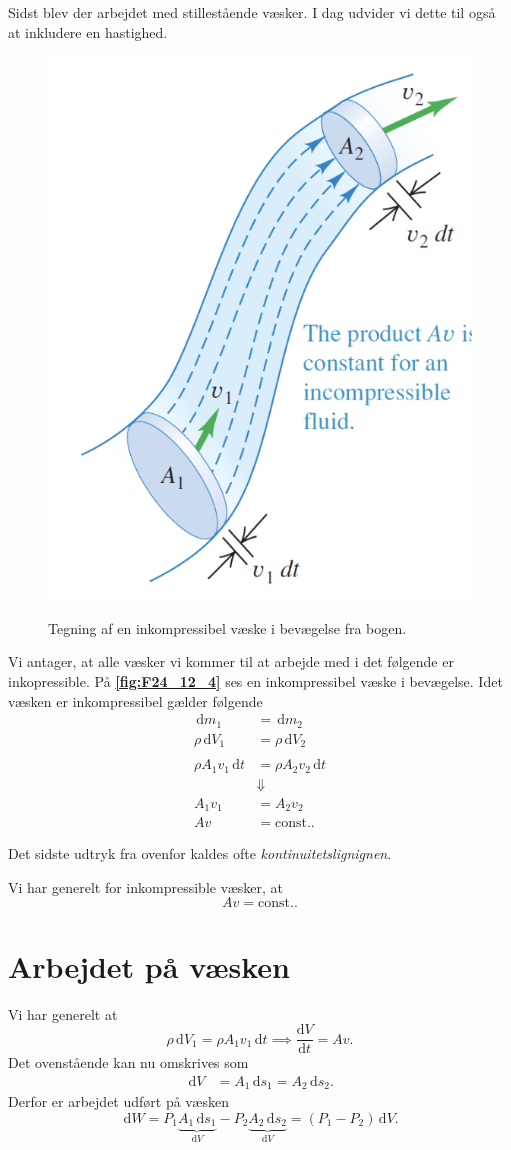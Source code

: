 Sidst blev der arbejdet med stillestående væsker. I dag udvider vi dette til også at inkludere en hastighed. 

\begin{figure} [ht]
  \centering
  \caption{Tegning af en inkompressibel væske i bevægelse fra bogen.}
  \includegraphics[width=0.3\linewidth]{./figures/F24_12_4.png}
  \label{fig:F24_12_4}
\end{figure}

Vi antager, at alle væsker vi kommer til at arbejde med i det følgende er inkopressible. På \textbf{\autoref{fig:F24_12_4}} ses en inkompressibel væske i bevægelse. Idet væsken er inkompressibel gælder følgende 
\begin{align*}  
  \, \mathrm{d}m_1 &= \, \mathrm{d}m_2  \\
  \rho \, \mathrm{d}V_1 &= \rho \, \mathrm{d}V_2 \\
  \\
  \rho A_1v_1 \, \mathrm{d}t &= \rho A_2 v_2 \, \mathrm{d}t  \\
  &\Downarrow \\
  A_1 v_1 &= A_2 v_2 \\
  A v &= \mathrm{const.}
.\end{align*} 

Det sidste udtryk fra ovenfor kaldes ofte \textit{kontinuitetslignignen}. 
\begin{sæt}[kontinuitetslignignen]
  Vi har generelt for inkompressible væsker, at
  \[ 
    A v = \mathrm{const.}
  .\]
\end{sæt}

\section{Arbejdet på væsken}
Vi har generelt at
\[ 
\rho \, \mathrm{d}V_1 = \rho A_1 v_1 \, \mathrm{d}t \implies \frac{\mathrm{d}V}{\mathrm{d}t} = Av
.\]
Det ovenstående kan nu omskrives som
\begin{align*}
  \, \mathrm{d}V &= A_1 \, \mathrm{d}s_1 = A_2 \, \mathrm{d}s_2
.\end{align*}
Derfor er arbejdet udført på væsken
\[ 
  \, \mathrm{d}W = P_1 \underbrace{A_1 \, \mathrm{d}s_1}_{\mathrm{d}V} - P_2 \underbrace{A_2 \, \mathrm{d}s_2}_{\mathrm{d}V} = (P_1 - P_2)\, \mathrm{d}V
.\]

